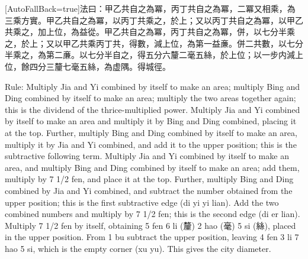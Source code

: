 \documentclass[11pt]{article}
\newcommand{\unitlabel}[1]{\marginpar{\raggedleft\tiny\color{gray}#1}}
\newenvironment{unitzh}{\par\CJKfontspec{Noto Serif CJK SC}[AutoFallBack=true]\large\linespread{1.25}\selectfont}{\par}
\newenvironment{uniten}{\par\small\color{black!85}}{\par\medskip}
\begin{document}
\begin{unitzh}\unitlabel{ceyuan-022.27}法曰：甲乙共自之為冪，丙丁共自之為冪，二冪又相乘，為三乘方實。甲乙共自之為冪，以丙丁共乘之，於上；又以丙丁共自之為冪，以甲乙共乘之，加上位，為益從。甲乙共自之為冪，丙丁共自之為冪，併，以七分半乘之，於上；又以甲乙共乘丙丁共，得數，減上位，為第一益亷。併二共數，以七分半乘之，為第二亷。以七分半自之，得五分六釐二毫五絲，於上位；以一步内減上位，餘四分三釐七毫五絲，為虚隅。得城徑。\end{unitzh}
\begin{uniten}Rule: Multiply Jia and Yi combined by itself to make an area; multiply Bing and Ding combined by itself to make an area; multiply the two areas together again; this is the dividend of the thrice-multiplied power. Multiply Jia and Yi combined by itself to make an area and multiply it by Bing and Ding combined, placing it at the top. Further, multiply Bing and Ding combined by itself to make an area, multiply it by Jia and Yi combined, and add it to the upper position; this is the subtractive following term. Multiply Jia and Yi combined by itself to make an area, and multiply Bing and Ding combined by itself to make an area; add them, multiply by 7 1/2 fen, and place it at the top. Further, multiply Bing and Ding combined by Jia and Yi combined, and subtract the number obtained from the upper position; this is the first subtractive edge (di yi yi lian). Add the two combined numbers and multiply by 7 1/2 fen; this is the second edge (di er lian). Multiply 7 1/2 fen by itself, obtaining 5 fen 6 li (釐) 2 hao (毫) 5 si (絲), placed in the upper position. From 1 bu subtract the upper position, leaving 4 fen 3 li 7 hao 5 si, which is the empty corner (xu yu). This gives the city diameter.\end{uniten}
\end{document}
